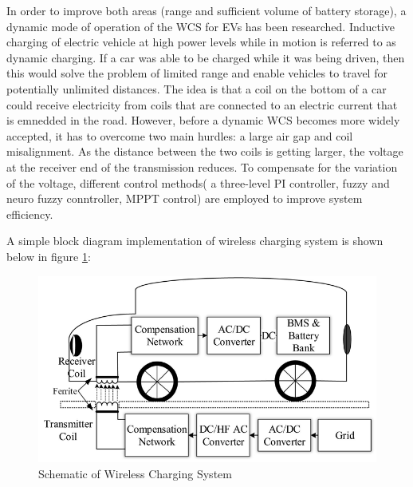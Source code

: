 \documentclass[12pt]{article}
\begin{document}
In order to improve both areas (range and sufficient volume of battery storage), a dynamic mode of operation of the WCS for EVs has been researched. Inductive charging of electric vehicle at high power levels while in motion is referred to as dynamic charging. If a car was able to be charged while it was being driven, then this would solve the problem of limited range and enable vehicles to travel for potentially unlimited distances. The idea is that a coil on the bottom of a car could receive electricity from coils that are connected to an electric current that is emnedded in the road. However, before a dynamic WCS becomes more widely accepted, it has to overcome two main hurdles: a large air gap and coil misalignment. As the distance between the two coils is getting larger, the voltage at the receiver end of the transmission reduces. To compensate for the variation of the voltage, different control methods( a three-level PI controller, fuzzy and neuro fuzzy conntroller, MPPT control) are employed to improve system efficiency. 

A simple block diagram implementation of wireless charging system is shown below in figure \ref{fig:scheme}:
\begin{figure}[h!]
	\centering
	\includegraphics[scale=0.5]{imgs/image1.jpg}
	\caption{Schematic of Wireless Charging System}
	\label{fig:scheme}
\end{figure}
\newpage
\end{document}
